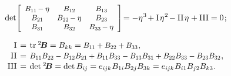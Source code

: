 \begin{otherlanguage}{russian}
\nopagebreak\vspace{-0.1em}\begin{equation}\label{chardetequation}
\operatorname{det}\! \scalebox{0.9}[0.92]{$\left[
\begin{array}{ccc}
B_{11} \hspace{-0.16ex} - \eigenvalue & B_{12} & B_{13} \\
B_{21} & B_{22} \hspace{-0.16ex} - \eigenvalue & B_{23} \\
B_{31} & B_{32} & B_{33} \hspace{-0.16ex} - \eigenvalue
\end{array}
\right]$} \!= - \eigenvalue^3 \hspace{-0.25ex} + \mathrm{I}\hspace{.25ex} \eigenvalue^2 \hspace{-0.25ex} - \mathrm{II}\hspace{.25ex} \eigenvalue + \mathrm{III} = 0 \hspace{.2ex} ;
\end{equation}

\vspace{-0.25em}\begin{equation}\label{invariants:2}
\begin{array}{r@{\hspace{.4em}}c@{\hspace{.4em}}l}
\mathrm{I} & = & \operatorname{tr}\hspace{.1ex} {^2\!\bm{B}} = B_{kk} = \scalebox{0.92}[0.96]{$B_{11} + B_{22} + B_{33}$} \hspace{.1ex} ,\\[0.1em]
\mathrm{II} & = & \scalebox{0.92}[0.96]{$B_{11}B_{22} - B_{12}B_{21} + B_{11}B_{33} - B_{13}B_{31} + B_{22}B_{33} - B_{23}B_{32}$} \hspace{.1ex} ,\\[0.1em]
\mathrm{III} & = & \operatorname{det} \hspace{.1ex} {^2\!\bm{B}} = \operatorname{det} B_{i\hspace{-0.1ex}j} = e_{i\hspace{-0.1ex}jk} \hspace{.1ex} B_{1i} B_{2j} B_{3k} = e_{i\hspace{-0.1ex}jk} \hspace{.1ex} B_{i1} B_{j2} B_{k3} \hspace{.1ex} .
\end{array}\end{equation}


\end{otherlanguage}
